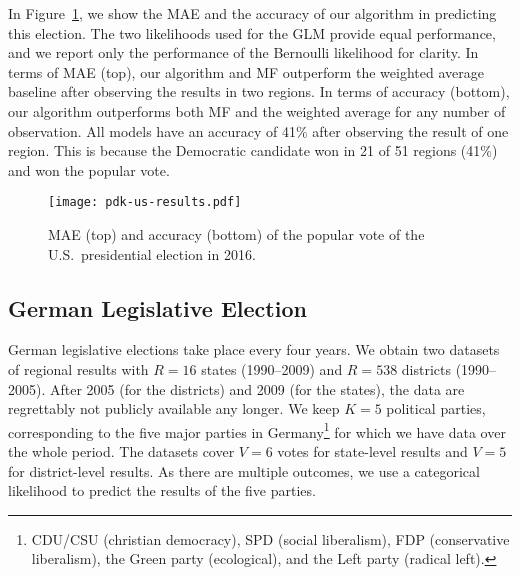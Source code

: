 In Figure~\ref{pdk:fig:us_results}, we show the MAE and the accuracy of our algorithm in predicting this election.
The two likelihoods used for the GLM provide equal performance, and we report only the performance of the Bernoulli likelihood for clarity.
In terms of MAE (top), our algorithm and MF outperform the weighted average baseline after observing the results in two regions.
In terms of accuracy (bottom), our algorithm outperforms both MF and the weighted average for any number of observation.
All models have an accuracy of 41\% after observing the result of one region.
This is because the Democratic candidate won in 21 of 51 regions (41\%) and won the popular vote.

\begin{figure}
	\centering
	\texttt{[image: pdk-us-results.pdf]}
	\caption{MAE (top) and accuracy (bottom) of the popular vote of the U.S.\ presidential election in 2016.}
	\label{pdk:fig:us_results}
\end{figure}

\subsection{German Legislative Election}

German legislative elections take place every four years.
We obtain two datasets~\cite{norsk2020germany} of regional results with $R=16$ states (1990--2009) and $R=538$ districts (1990--2005).
After 2005 (for the districts) and 2009 (for the states), the data are regrettably not publicly available any longer.
We keep $K = 5$ political parties, corresponding to the five major parties in Germany\footnote{CDU/CSU (christian democracy), SPD (social liberalism), FDP (conservative liberalism), the Green party (ecological), and the Left party (radical left).} for which we have data over the whole period.
The datasets cover $V=6$ votes for state-level results and $V=5$ for district-level results.
As there are multiple outcomes, we use a categorical likelihood to predict the results of the five parties.

